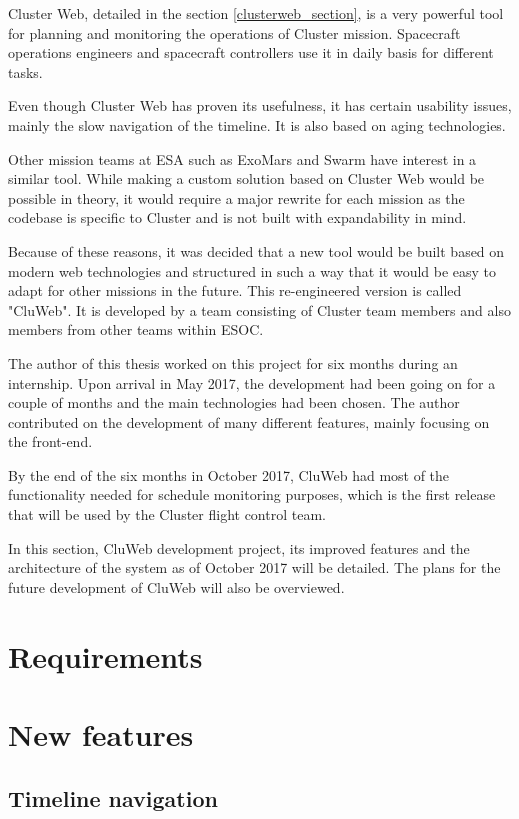 Cluster Web, detailed in the section \ref{clusterweb_section}, is a very powerful tool for planning and monitoring the operations of Cluster mission. Spacecraft operations engineers and spacecraft controllers use it in daily basis for different tasks.

Even though Cluster Web has proven its usefulness, it has certain usability issues, mainly the slow navigation of the timeline. It is also based on aging technologies.

Other mission teams at ESA such as ExoMars and Swarm have interest in a similar tool. While making a custom solution based on Cluster Web would be possible in theory, it would require a major rewrite for each mission as the codebase is specific to Cluster and is not built with expandability in mind.

Because of these reasons, it was decided that a new tool would be built based on modern web technologies and structured in such a way that it would be easy to adapt for other missions in the future. This re-engineered version is called "CluWeb". It is developed by a team consisting of Cluster team members and also members from other teams within ESOC.

The author of this thesis worked on this project for six months during an internship. Upon arrival in May 2017, the development had been going on for a couple of months and the main technologies had been chosen. The author contributed on the development of many different features, mainly focusing on the front-end. 

By the end of the six months in October 2017, CluWeb had most of the functionality needed for schedule monitoring purposes, which is the first release that will be used by the Cluster flight control team.

In this section, CluWeb development project, its improved features and the architecture of the system as of October 2017 will be detailed. The plans for the future development of CluWeb will also be overviewed.

\section{Requirements}
\section{New features}
\subsection{Timeline navigation}
